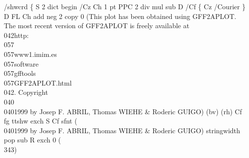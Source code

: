 \documentclass[11pt]{article}
\begin{document}
\nwenddocs{}\endmoddef
/shwcrd \{           %
  S                 %
    2 dict begin    %
      /Cz             %
        Ch 1 pt PPC   %
        2 div mul sub %
      D               %
      /Cf \{         %
        Cz /Courier %
      \} D           %
      FL            %
      Ch add        %
      neg           %
      2 copy        %
      0             %
(This plot has been obtained using GFF2APLOT.     %
 The most recent version of GFF2APLOT is freely   %
 available at                                     %
\\042http:\\057\\057www1.imim.es\\057software\\057gfftools\\057GFF2APLOT.html\\042. %
Copyright\\040\\0401999                             %
by Josep F. ABRIL, Thomas WIEHE & Roderic GUIGO)  %
      (bv)          %
      (rh)          %
      Cf            %
      fg            %
      ttshw         %
      exch          %
      S             %
        Cf sfnt     %
(\\0401999 by Josep F. ABRIL, Thomas WIEHE & Roderic GUIGO) %
        stringwidth %
        pop         %
        sub         %
      R             %
      exch          %
      0             %
      (\\343)        %
\end{document}
